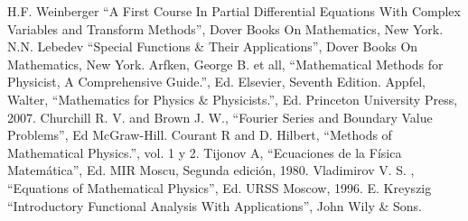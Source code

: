 \documentclass[letterpaper]{book}
\begin{document}
\begin{thebibliography}{9}

 H.F. Weinberger ``A First Course In Partial Differential Equations With Complex Variables and Transform Methods'', Dover Books On Mathematics, New York.
 N.N. Lebedev ``Special Functions \& Their Applications'', Dover Books On Mathematics, New York.
 Arfken, George B. et all, ``Mathematical Methods for Physicist, A Comprehensive Guide.'', Ed. Elsevier, Seventh Edition.
 Appfel, Walter, ``Mathematics for Physics \& Physicists.'', Ed. Princeton University Press, 2007.
 Churchill R. V. and Brown J. W., ``Fourier Series and Boundary Value Problems'', Ed McGraw-Hill.
 Courant R and D. Hilbert, ``Methods of Mathematical Physics.'', vol. 1 y 2.
 Tijonov A, ``Ecuaciones de la Física Matemática'', Ed. MIR Moscu, Segunda edición, 1980.
 Vladimirov V. S. , ``Equations of Mathematical Physics'', Ed. URSS Moscow, 1996.
 E. Kreyszig ``Introductory Functional Analysis With Applications'', John Wily \& Sons.

\end{thebibliography}
\end{document}
